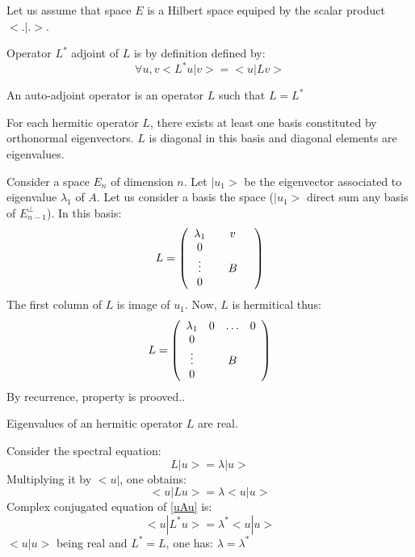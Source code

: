 \documentclass[12pt]{book}
\begin{document}
Let us assume that space $E$ is a Hilbert space equiped by the scalar
product $< . | . >$.
\begin{defn}
Operator $L^*$ adjoint of $L$ is by definition defined by:
\begin{equation} 
\forall u, v   \mathrel{<} L^*u|v\mathrel{>} = \mathrel{<} u|Lv\mathrel{>} 
\end{equation}
\end{defn}
\begin{defn} 
An auto-adjoint operator is an operator $L$ such that $L=L^*$
\end{defn}
\begin{thm}
For each hermitic operator  $L$, there exists at least one basis constituted by
orthonormal eigenvectors. $L$ is diagonal in this basis and diagonal elements
are eigenvalues.
\end{thm}
\begin{pf}
Consider a space $E_n$ of dimension $n$.
Let  $|u_1\mathrel{>} $ be the eigenvector associated to eigenvalue $\lambda_1$ of
$A$. Let us consider a basis the space ($|u_1\mathrel{>} $ direct sum any basis of
$E^\perp_{n-1}$).
In this basis: 
\begin{equation}
L= 
\left( \begin{array}{cccc}
\lambda_1& &v& \cr
             0& & & \cr
             \vdots& &B& \cr
              0& & & \cr
\end{array} \right)
\end{equation}
The first column of $L$ is image of $u_1$.
Now, $L$ is hermitical thus:
\begin{equation}
L= 
\left( \begin{array}{cccc}
\lambda_1&0&\ldots&0 \cr
             0& & & \cr
             \vdots& &B& \cr
              0& & & \cr
\end{array} \right)
\end{equation}
By recurrence, property is prooved..
\end{pf}
\begin{thm}
Eigenvalues of an hermitic operator $L$ are real.
\end{thm}
\begin{pf}
Consider the spectral equation:
\begin{equation}
L|u\mathrel{>} =\lambda|u\mathrel{>} 
\end{equation}
Multiplying it by $ \mathrel{<} u|$, one obtains:
\begin{equation}
 \mathrel{<} u|Lu\mathrel{>} =\lambda \mathrel{<} u|u\mathrel{>} 
\label{uAu}
\end{equation}
Complex conjugated equation of \ref{uAu} is:
\begin{equation}
 \mathrel{<} u|L^*u\mathrel{>} =\lambda^* \mathrel{<} u|u\mathrel{>} 
\end{equation}
$ \mathrel{<} u|u\mathrel{>} $ being real and $L^*=L$, one has:
$\lambda=\lambda^*$ 
\end{pf}
\end{document}
